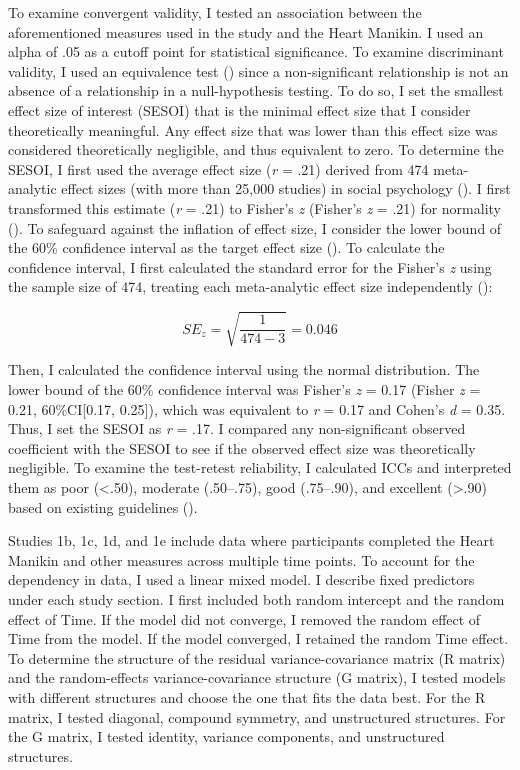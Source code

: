 \documentclass[
]{udthesis}
\begin{document}
To examine convergent validity, I tested an association between the
aforementioned measures used in the study and the Heart Manikin. I used
an alpha of .05 as a cutoff point for statistical significance. To
examine discriminant validity, I used an equivalence test () since a
non-significant relationship is not an absence of a relationship in a
null-hypothesis testing. To do so, I set the smallest effect size of
interest (SESOI) that is the minimal effect size that I consider
theoretically meaningful. Any effect size that was lower than this
effect size was considered theoretically negligible, and thus equivalent
to zero. To determine the SESOI, I first used the average effect size
(\emph{r} = .21) derived from 474 meta-analytic effect sizes (with more than
25,000 studies) in social psychology (). I first transformed
this estimate (\emph{r} = .21) to Fisher's \emph{z} (Fisher's \emph{z} = .21) for normality (). To
safeguard against the inflation of effect size, I consider the lower
bound of the 60\% confidence interval as the target effect size ().
To calculate the confidence interval, I first calculated the standard
error for the Fisher's \emph{z} using the sample size of 474, treating each
meta-analytic effect size independently ():

\[SE_{z} = \sqrt{\frac{1}{474-3}} = 0.046\]

Then, I calculated the confidence interval using the normal
distribution. The lower bound of the 60\% confidence interval was
Fisher's \emph{z} = 0.17 (Fisher \emph{z} = 0.21, 60\%CI{[}0.17, 0.25{]}), which was
equivalent to \emph{r} = 0.17 and Cohen's \emph{d} = 0.35. Thus, I set the SESOI
as \emph{r} = .17. I compared any non-significant observed coefficient with
the SESOI to see if the observed effect size was theoretically
negligible. To examine the test-retest reliability, I calculated ICCs
and interpreted them as poor (\textless.50), moderate (.50--.75), good
(.75--.90), and excellent (\textgreater.90) based on existing guidelines
().

Studies 1b, 1c, 1d, and 1e include data where participants completed the
Heart Manikin and other measures across multiple time points. To account
for the dependency in data, I used a linear mixed model. I describe fixed predictors under each study section. I first included
both random intercept and the random effect of Time. If the model did
not converge, I removed the random effect of Time from the model. If
the model converged, I retained the random Time effect. To determine
the structure of the residual variance-covariance matrix (R matrix) and
the random-effects variance-covariance structure (G matrix), I tested
models with different structures and choose the one that fits the data
best. For the R matrix, I tested diagonal, compound symmetry, and
unstructured structures. For the G matrix, I tested identity,
variance components, and unstructured structures.
\end{document}
